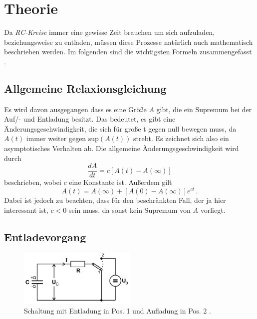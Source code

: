 \section{Theorie}
\label{sec:Theorie}

Da \textit{RC-Kreise} immer eine gewisse Zeit brauchen um sich aufzuladen, beziehungsweise zu entladen,
müssen diese Prozesse natürlich auch mathematisch beschrieben werden.
Im folgenden sind die wichtigsten Formeln zusammengefasst \cite[1-5]{v353}.

\subsection{Allgemeine Relaxionsgleichung}
Es wird davon ausgegangen dass es eine Größe $A$ gibt, die ein Supremum bei der Auf/- und Entladung besitzt.
Das bedeutet, es gibt eine Änderungsgeschwindigkeit, die sich für große t gegen null bewegen muss, da
$A(t)$ immer weiter gegen $\text{sup}(A(t))$ strebt.
Es zeichnet sich also ein asymptotisches Verhalten ab.
Die allgemeine Änderungsgeschwindigkeit wird durch
\begin{equation}
    \frac {dA}{dt} = c \left[ A(t) - A(\infty) \right]
\end{equation}
beschrieben, wobei $c$ eine Konstante ist.
Außerdem gilt
\begin{equation}
A(t) = A(\infty) + \left[ A(0) - A(\infty) \right] e^{ct} \, .
\end{equation}
Dabei ist jedoch zu beachten, dass für den beschränkten Fall, der ja hier interessant ist,
$c < 0$ sein muss, da sonst kein Supremum von $A$ vorliegt.


\subsection{Entladevorgang}
\begin{figure}
    \centering
    \includegraphics[width=0.5\textwidth]{pictures/Schaltung1.png}
    \caption{Schaltung mit Entladung in Pos. 1 und Aufladung in Pos. 2 \cite[1]{v353}.}
    \label{fig:Schaltung1}
\end{figure}

